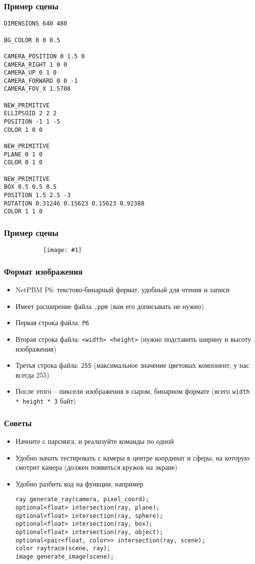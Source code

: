 \documentclass[10pt]{beamer}
\newcommand{\slideimage}[1]{
  \begin{figure}
    \begin{adjustbox}{width=\textwidth, totalheight=\textheight-2\baselineskip-2\baselineskip,keepaspectratio}
      \texttt{[image: \#1]}
    \end{adjustbox}
  \end{figure}
}
\begin{document}
\begin{frame}[fragile]
\frametitle{Пример сцены}
\begin{verbatim}
DIMENSIONS 640 480

BG_COLOR 0 0 0.5

CAMERA_POSITION 0 1.5 0
CAMERA_RIGHT 1 0 0
CAMERA_UP 0 1 0
CAMERA_FORWARD 0 0 -1
CAMERA_FOV_X 1.5708

NEW_PRIMITIVE
ELLIPSOID 2 2 2
POSITION -1 1 -5
COLOR 1 0 0

NEW_PRIMITIVE
PLANE 0 1 0
COLOR 0 1 0

NEW_PRIMITIVE
BOX 0.5 0.5 0.5
POSITION 1.5 2.5 -3
ROTATION 0.31246 0.15623 0.15623 0.92388
COLOR 1 1 0
\end{verbatim}
\end{frame}

\begin{frame}
\frametitle{Пример сцены}
\begin{figure}
\slideimage{result.png}
\end{figure}
\end{frame}

\begin{frame}
\frametitle{Формат изображения}
\begin{itemize}
\item NetPBM P6: текстово-бинарный формат, удобный для чтения и записи
\pause
\item Имеет расширение файла \texttt{.ppm} (вам его дописывать не нужно)
\pause
\item Первая строка файла: \texttt{P6}
\item Вторая строка файла: \texttt{<width> <height>} (нужно подставить ширину и высоту изображения)
\item Третья строка файла: \texttt{255} (максимальное значение цветовых компонент, у нас всегда 255)
\item После этого -- пиксели изображения в сыром, бинарном формате (всего \texttt{width * height * 3} байт)
\end{itemize}
\end{frame}

\begin{frame}[fragile]
\frametitle{Советы}
\begin{itemize}
\item Начните с парсинга, и реализуйте команды по одной
\pause
\item Удобно начать тестировать с камеры в центре координат и сферы, на которую смотрит камера (должен появиться кружок на экране)
\pause
\item Удобно разбить код на функции, например
\begin{verbatim}
ray generate_ray(camera, pixel_coord);
optional<float> intersection(ray, plane);
optional<float> intersection(ray, sphere);
optional<float> intersection(ray, box);
optional<float> intersection(ray, object);
optional<pair<float, color>> intersection(ray, scene);
color raytrace(scene, ray);
image generate_image(scene);
\end{verbatim}
\end{itemize}
\end{frame}
\end{document}
